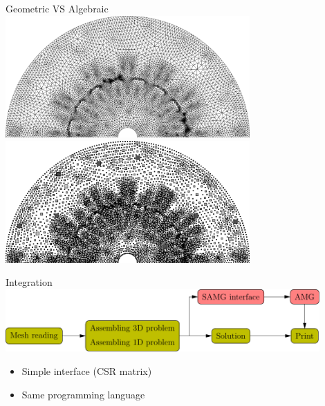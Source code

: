 \documentclass{beamer}
\begin{document}
\begin{frame}{Geometric VS Algebraic}
\centering
\vfill
\includegraphics[width=0.7\textwidth]{figure/compex1.png}
\vfill
\includegraphics[width=0.7\textwidth]{figure/compex2.png}
\vfill
\end{frame}
\begin{frame}{Integration}
\includegraphics[width=0.9\textwidth]{figure/flowchart}
\begin{itemize}
\item Simple interface (CSR matrix)
\item Same programming language
\end{itemize}
\end{frame}
\end{document}
